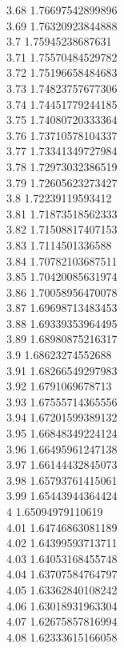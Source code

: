{3.68	1.76697542899896\\
3.69	1.76320923844888\\
3.7	1.75945238687631\\
3.71	1.75570484529782\\
3.72	1.75196658484683\\
3.73	1.74823757677306\\
3.74	1.74451779244185\\
3.75	1.74080720333364\\
3.76	1.73710578104337\\
3.77	1.73341349727984\\
3.78	1.72973032386519\\
3.79	1.72605623273427\\
3.8	1.72239119593412\\
3.81	1.71873518562333\\
3.82	1.71508817407153\\
3.83	1.7114501336588\\
3.84	1.70782103687511\\
3.85	1.70420085631974\\
3.86	1.70058956470078\\
3.87	1.69698713483453\\
3.88	1.69339353964495\\
3.89	1.68980875216317\\
3.9	1.68623274552688\\
3.91	1.68266549297983\\
3.92	1.6791069678713\\
3.93	1.67555714365556\\
3.94	1.67201599389132\\
3.95	1.66848349224124\\
3.96	1.66495961247138\\
3.97	1.66144432845073\\
3.98	1.65793761415061\\
3.99	1.65443944364424\\
4	1.65094979110619\\
4.01	1.64746863081189\\
4.02	1.64399593713711\\
4.03	1.64053168455748\\
4.04	1.63707584764797\\
4.05	1.63362840108242\\
4.06	1.63018931963304\\
4.07	1.62675857816994\\
4.08	1.62333615166058\\
}
